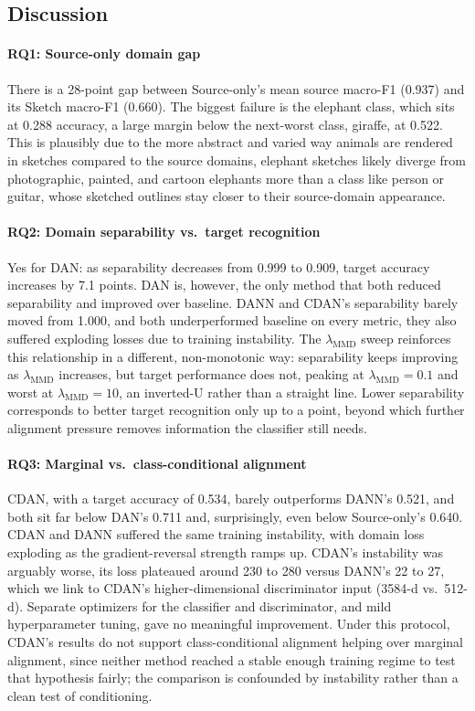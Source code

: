 \documentclass{article}
\begin{document}
\subsection{Discussion}

\paragraph{RQ1: Source-only domain gap}

There is a 28-point gap between Source-only's mean source macro-F1 (0.937) and its Sketch macro-F1 (0.660). The biggest failure is the elephant class, which sits at 0.288 accuracy, a large margin below the next-worst class, giraffe, at 0.522. This is plausibly due to the more abstract and varied way animals are rendered in sketches compared to the source domains, elephant sketches likely diverge from photographic, painted, and cartoon elephants more than a class like person or guitar, whose sketched outlines stay closer to their source-domain appearance.

\paragraph{RQ2: Domain separability vs.\ target recognition}

Yes for DAN: as separability decreases from 0.999 to 0.909, target accuracy increases by 7.1 points. DAN is, however, the only method that both reduced separability and improved over baseline. DANN and CDAN's separability barely moved from 1.000, and both underperformed baseline on every metric, they also suffered exploding losses due to training instability. The $\lambda_\text{MMD}$ sweep reinforces this relationship in a different, non-monotonic way: separability keeps improving as $\lambda_\text{MMD}$ increases, but target performance does not, peaking at $\lambda_\text{MMD}=0.1$ and worst at $\lambda_\text{MMD}=10$, an inverted-U rather than a straight line. Lower separability corresponds to better target recognition only up to a point, beyond which further alignment pressure removes information the classifier still needs.

\paragraph{RQ3: Marginal vs.\ class-conditional alignment}

CDAN, with a target accuracy of 0.534, barely outperforms DANN's 0.521, and both sit far below DAN's 0.711 and, surprisingly, even below Source-only's 0.640. CDAN and DANN suffered the same training instability, with domain loss exploding as the gradient-reversal strength ramps up. CDAN's instability was arguably worse, its loss plateaued around 230 to 280 versus DANN's 22 to 27, which we link to CDAN's higher-dimensional discriminator input (3584-d vs.\ 512-d). Separate optimizers for the classifier and discriminator, and mild hyperparameter tuning, gave no meaningful improvement. Under this protocol, CDAN's results do not support class-conditional alignment helping over marginal alignment, since neither method reached a stable enough training regime to test that hypothesis fairly; the comparison is confounded by instability rather than a clean test of conditioning.
\end{document}
